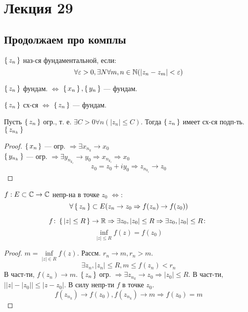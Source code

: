\section{Лекция 29}
\subsection{Продолжаем про комплы}
\begin{definition}
$\set{z_n}$ наз-ся фундаментальной, если:
\[
\forall \varepsilon > 0, \exists N \forall m, n \in \mathbb{N} (\left|z_n - z_m\right| < \varepsilon)
\]
\end{definition}
\begin{consequence}
  \label{cs:fund_1}
$\set{z_n}$ фундам. $\iff$ $\set{x_n}, \set{y_n}$ --- фундам.
\end{consequence}
\begin{theorem}
\label{th:cauchey_in_C}
$\set{z_n}$ сх-ся $\iff$ $\set{z_n}$ --- фундам.
\end{theorem}
\begin{consequence}
  \label{cs:fund_2}
  Пусть $\set{z_n}$ огр., т. е. $\exists C > 0 \forall n (\left|z_n\right| \leq C)$. Тогда $\set{z_n}$ имеет сх-ся подп-ть. $\set{z_{n_k}}$
\end{consequence}
\begin{proof}
$\set{x_n}$ --- огр. $\Rightarrow \exists x_{n_k} \rightarrow x_0$ \\
$\set{y_{n_k}}$ --- огр. $\Rightarrow \exists y_{n_{k_i}} \rightarrow y_0 \Rightarrow x_{n_{k_i}} \Rightarrow x_0$
\[
z_0 = z_0 + iy_0 \Rightarrow z_{n_{k_i}} \rightarrow z_0
\]
\end{proof}
\begin{definition}
$f:E \subset \mathbb{C} \rightarrow \mathbb{C}$ непр-на в точке $z_0$ $\iff$:
\[
  \forall \set{z_n} \subset E (z_n \rightarrow z_0 \Rightarrow f(z_n) \rightarrow f(z_0))
\]
\end{definition}
\begin{example}
  \[
    f \colon \set{\left|z\right| \leq R} \rightarrow \mathbb{R} \Rightarrow \exists z_0, \left|z_0\right| \leq R \Rightarrow \exists z_0, \left|z_0\right| \leq R \colon
  \]
  \[
    \underset{\left|z\right| \leq R}{\inf} f(z) = f(z_0)
  \]
\end{example}
\begin{proof}
$m = \underset{\left|z\right| \in R}{\inf} f(z)$. Рассм. $r_n \rightarrow m, r_n > m$.
\[
\exists z_n, \left|z_n\right| \leq R, m \leq f(z_n) < r_n
\]
В част-ти, $f(z_n) \rightarrow m$. $\set{z_n}$ огр. $\Rightarrow \exists z_{n_k} \rightarrow z_0 \Rightarrow \left|z_0\right| \leq R$. В част-ти, $\left||z| - |z_0|\right| \leq \left|z - z_0\right|$. В силу непр-ти $f$ в точке $z_0$.
\[
  f(z_{n_k}) \rightarrow f(z_0), f(z_{n_k}) \rightarrow m \Rightarrow f(z_0) = m
\]
\end{proof}
